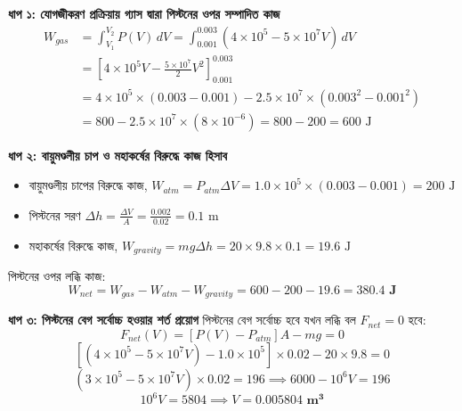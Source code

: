 \documentclass[12pt, a4paper]{article}
\begin{document}
\begin{tcolorbox}[solutionbox={সমাধান (Solution)}]
    \noindent
    \textbf{ধাপ ১: যোগজীকরণ প্রক্রিয়ায় গ্যাস দ্বারা পিস্টনের ওপর সম্পাদিত কাজ}
    \begin{align*}
        W_{gas} &= \int_{V_1}^{V_2} P(V) \, dV = \int_{0.001}^{0.003} (4 \times 10^5 - 5 \times 10^7 V) \, dV \\
        &= \left[ 4 \times 10^5 V - \frac{5 \times 10^7}{2} V^2 \right]_{0.001}^{0.003} \\
        &= 4 \times 10^5 \times (0.003 - 0.001) - 2.5 \times 10^7 \times (0.003^2 - 0.001^2) \\
        &= 800 - 2.5 \times 10^7 \times (8 \times 10^{-6}) = 800 - 200 = 600\text{ J}
    \end{align*}
    
    \vspace{0.4em}
    \noindent\textbf{ধাপ ২: বায়ুমণ্ডলীয় চাপ ও মহাকর্ষের বিরুদ্ধে কাজ হিসাব}
    \begin{itemize}[leftmargin=1.5em, itemsep=0.2em]
        \item বায়ুমণ্ডলীয় চাপের বিরুদ্ধে কাজ, $W_{atm} = P_{atm} \Delta V = 1.0 \times 10^5 \times (0.003 - 0.001) = 200\text{ J}$
        \item পিস্টনের সরণ $\Delta h = \frac{\Delta V}{A} = \frac{0.002}{0.02} = 0.1\text{ m}$
        \item মহাকর্ষের বিরুদ্ধে কাজ,  $W_{gravity} = m g \Delta h = 20 \times 9.8 \times 0.1 = 19.6\text{ J}$
    \end{itemize}
    পিস্টনের ওপর লব্ধি কাজ:
    \[ W_{net} = W_{gas} - W_{atm} - W_{gravity} = 600 - 200 - 19.6 = \mathbf{380.4\text{ J}} \]
    
    \vspace{0.4em}
    \noindent\textbf{ধাপ ৩: পিস্টনের বেগ সর্বোচ্চ হওয়ার শর্ত প্রয়োগ}
    পিস্টনের বেগ সর্বোচ্চ হবে যখন লব্ধি বল $F_{net} = 0$ হবে:
    \[ F_{net}(V) = [P(V) - P_{atm}] A - m g = 0 \]
    \[ [(4 \times 10^5 - 5 \times 10^7 V) - 1.0 \times 10^5] \times 0.02 - 20 \times 9.8 = 0 \]
    \[ (3 \times 10^5 - 5 \times 10^7 V) \times 0.02 = 196 \implies 6000 - 10^6 V = 196 \]
    \[ 10^6 V = 5804 \implies V = \mathbf{0.005804\text{ m}^3} \]
\end{tcolorbox}

\vspace{2em}
\end{document}
